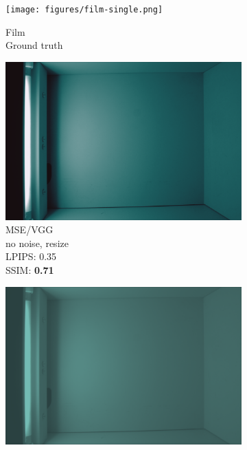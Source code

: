 \begin{figure}
    \begin{subfigure}[t]{.19\textwidth}
        \centering
        \texttt{[image: figures/film-single.png]}
        \caption{Film \\ Ground truth}
      \end{subfigure}
    \hfill
    \begin{subfigure}[t]{.19\textwidth}
        \centering
        \includegraphics[width=\linewidth]{figures/mse-vgg-no-noise-resize-single.png}
        \caption{MSE/VGG \\ no noise, resize \\ LPIPS: 0.35 \\ SSIM: \textbf{0.71}}
      \end{subfigure}
    \hfill
    \begin{subfigure}[t]{.19\textwidth}
        \centering
        \includegraphics[width=\linewidth]{figures/mse-no-noise-no-resize-single.png}

\end{subfigure}
\end{figure}

